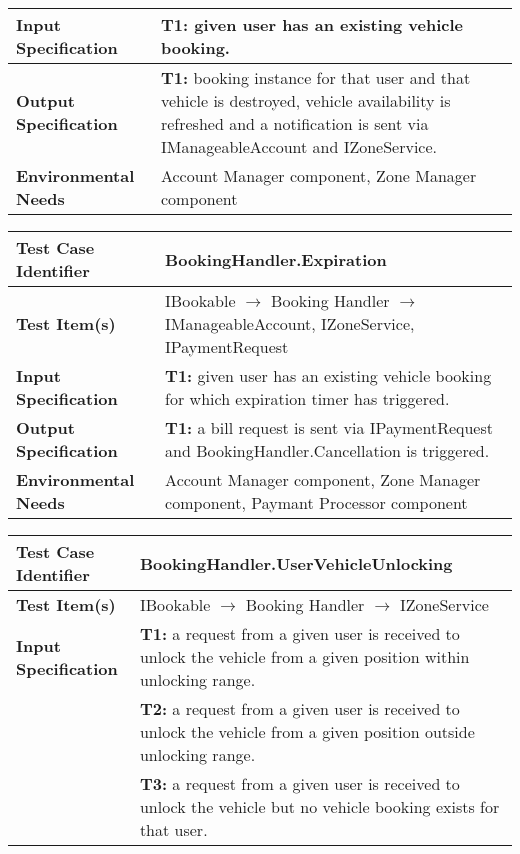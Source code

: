 {\begin{tabularx}{\textwidth}{l X}
    \textbf{Input Specification} & \textbf{T1:} given user has an existing vehicle booking. \\
    \hline 
    
    \textbf{Output Specification} & \textbf{T1:} booking instance for that user and that vehicle is destroyed, vehicle availability is refreshed and a notification is sent via IManageableAccount and IZoneService.\\
    \hline 
    
    \textbf{Environmental Needs} & Account Manager component, Zone Manager component\\
    \hline
\end{tabularx}
\bigskip 

\noindent
\begin{tabularx}{\textwidth}{l X}
    \hline 
    \textbf{Test Case Identifier} & BookingHandler.Expiration\\ %
    \hline 
    
    \textbf{Test Item(s)} & IBookable $\rightarrow$ Booking Handler $\rightarrow$ IManageableAccount, IZoneService, IPaymentRequest\\
    \hline 
    
    \textbf{Input Specification} & \textbf{T1:} given user has an existing vehicle booking for which expiration timer has triggered. \\
    \hline 
    
    \textbf{Output Specification} & \textbf{T1:} a bill request is sent via IPaymentRequest and BookingHandler.Cancellation is triggered.\\
    \hline 
    
    \textbf{Environmental Needs} & Account Manager component, Zone Manager component, Paymant Processor component\\
    \hline
\end{tabularx}
\bigskip 

\noindent
\begin{tabularx}{\textwidth}{l X}
    \hline 
    \textbf{Test Case Identifier} & BookingHandler.UserVehicleUnlocking\\ 
    \hline 
    
    \textbf{Test Item(s)} & IBookable $\rightarrow$ Booking Handler $\rightarrow$ IZoneService\\
    \hline 
    
    \textbf{Input Specification} & \textbf{T1:} a request from a given user is received to unlock the vehicle from a given position within unlocking range.\\
                                & \textbf{T2:} a request from a given user is received to unlock the vehicle from a given position outside unlocking range.\\
                                & \textbf{T3:} a request from a given user is received to unlock the vehicle but no vehicle booking exists for that user.\\
    \hline 
    

\end{tabularx}}
